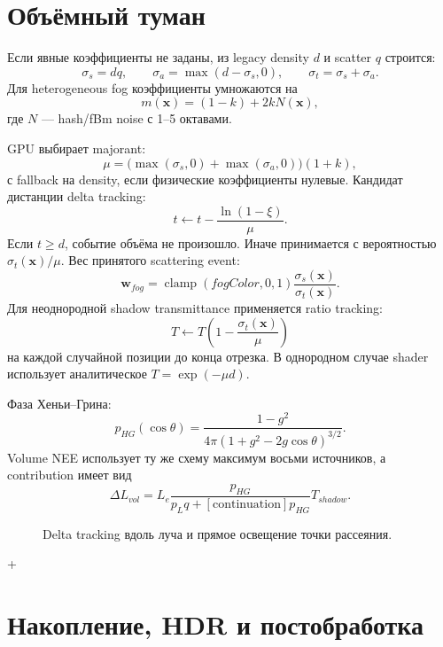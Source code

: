 \documentclass[11pt,a4paper]{article}
\newcommand{\vect}[1]{\boldsymbol{#1}}
\begin{document}
\section{Объёмный туман}

Если явные коэффициенты не заданы, из legacy density $d$ и scatter $q$ строится:
\[
 \sigma_s=dq,\qquad \sigma_a=\max(d-\sigma_s,0),\qquad
 \sigma_t=\sigma_s+\sigma_a.
\]
Для heterogeneous fog коэффициенты умножаются на
\[
 m(\vect x)=(1-k)+2kN(\vect x),
\]
где $N$ --- hash/fBm noise с 1--5 октавами.

GPU выбирает majorant:
\[
 \mu=\bigl(\max(\sigma_s,0)+\max(\sigma_a,0)\bigr)(1+k),
\]
с fallback на density, если физические коэффициенты нулевые. Кандидат дистанции
delta tracking:
\[
 t\leftarrow t-\frac{\ln(1-\xi)}{\mu}.
\]
Если $t\ge d$, событие объёма не произошло. Иначе принимается с вероятностью
$\sigma_t(\vect x)/\mu$. Вес принятого scattering event:
\[
 \vect w_{fog}=\operatorname{clamp}(fogColor,0,1)\frac{\sigma_s(\vect x)}{\sigma_t(\vect x)}.
\]
Для неоднородной shadow transmittance применяется ratio tracking:
\[
 T\leftarrow T\left(1-\frac{\sigma_t(\vect x)}{\mu}\right)
\]
на каждой случайной позиции до конца отрезка. В однородном случае shader использует
аналитическое $T=\exp(-\mu d)$.

Фаза Хеньи--Грина:
\[
 p_{HG}(\cos\theta)=\frac{1-g^2}{4\pi(1+g^2-2g\cos\theta)^{3/2}}.
\]
Volume NEE использует ту же схему максимум восьми источников, а contribution имеет
вид
\[
 \Delta L_{vol}=L_e\frac{p_{HG}}{p_Lq+[\text{continuation}]p_{HG}}T_{shadow}.
\]

\begin{figure}[ht]
\centering
{}
\caption{Delta tracking вдоль луча и прямое освещение точки рассеяния.}
\end{figure}

+
\section{Накопление, HDR и постобработка}
\end{document}
